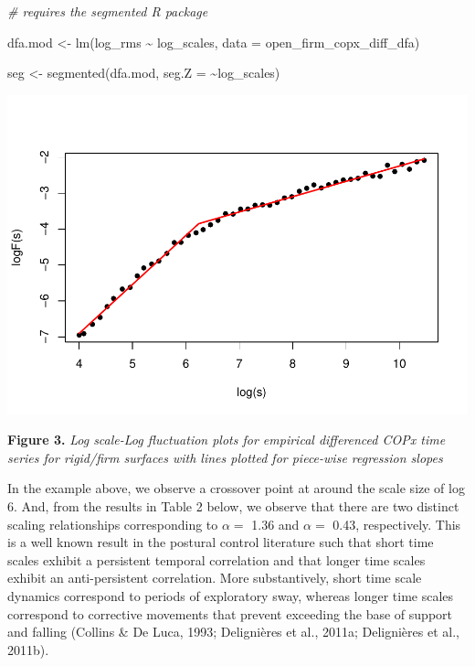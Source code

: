 \documentclass[
  man]{apa6}
\newenvironment{Shaded}{\begin{snugshade}}{\end{snugshade}}
\newcommand{\AttributeTok}[1]{\textcolor[rgb]{0.77,0.63,0.00}{#1}}
\newcommand{\CommentTok}[1]{\textcolor[rgb]{0.56,0.35,0.01}{\textit{#1}}}
\newcommand{\FunctionTok}[1]{\textcolor[rgb]{0.00,0.00,0.00}{#1}}
\newcommand{\NormalTok}[1]{#1}
\newcommand{\OtherTok}[1]{\textcolor[rgb]{0.56,0.35,0.01}{#1}}
\newcommand{\SpecialCharTok}[1]{\textcolor[rgb]{0.00,0.00,0.00}{#1}}
\begin{document}
\begin{Shaded}
\begin{Highlighting}[]
\CommentTok{\# requires the segmented R package}

\NormalTok{dfa.mod }\OtherTok{\textless{}{-}} \FunctionTok{lm}\NormalTok{(log\_rms }\SpecialCharTok{\textasciitilde{}}\NormalTok{ log\_scales, }\AttributeTok{data =}\NormalTok{ open\_firm\_copx\_diff\_dfa)}

\NormalTok{seg }\OtherTok{\textless{}{-}} \FunctionTok{segmented}\NormalTok{(dfa.mod, }\AttributeTok{seg.Z =} \SpecialCharTok{\textasciitilde{}}\NormalTok{log\_scales)}
\end{Highlighting}
\end{Shaded}

\includegraphics{fractal_regression_paper_brm_files/figure-latex/unnamed-chunk-7-1.pdf}

\textbf{Figure 3.} \emph{Log scale-Log fluctuation plots for empirical differenced
COPx time series for rigid/firm surfaces with lines plotted for
piece-wise regression slopes}

In the example above, we observe a crossover point at around the scale
size of log 6. And, from the results in Table 2 below, we observe that
there are two distinct scaling relationships corresponding to \(\alpha =\)
1.36 and \(\alpha =\) 0.43, respectively. This is a well known result in
the postural control literature such that short time scales exhibit a
persistent temporal correlation and that longer time scales exhibit an
anti-persistent correlation. More substantively, short time scale
dynamics correspond to periods of exploratory sway, whereas longer time
scales correspond to corrective movements that prevent exceeding the
base of support and falling (Collins \& De Luca, 1993; Delignières et al., 2011a; Delignières et al., 2011b).
\end{document}
